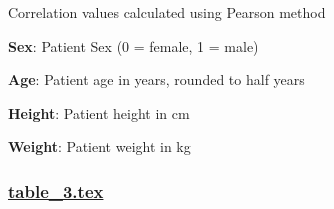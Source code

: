 \documentclass[11pt]{article}
\begin{document}
\begin{codeoutput}
\begin{table}[h]
\caption{Correlation between variables and the target variable}
\label{table:correlation_to_target}
\begin{threeparttable}
\renewcommand{\TPTminimum}{\linewidth}
\begin{tablenotes}
\footnotesize
\item Correlation values calculated using Pearson method
\item \textbf{Sex}: Patient Sex (0 = female, 1 = male)
\item \textbf{Age}: Patient age in years, rounded to half years
\item \textbf{Height}: Patient height in cm
\item \textbf{Weight}: Patient weight in kg
\end{tablenotes}
\end{threeparttable}
\end{table}

\end{codeoutput}

\subsubsection*{\hyperlink{code-LaTeX Table Design-table-3-tex}{table\_3.tex}}
\end{document}
